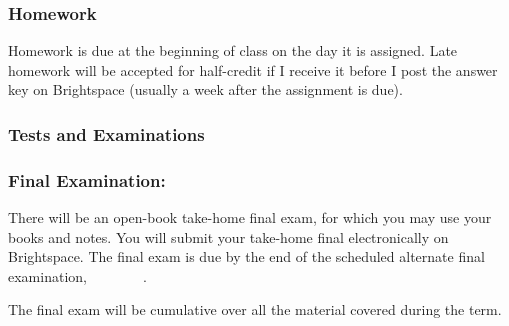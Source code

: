 \documentclass[11pt,twoside]{jgsyllabus}\usepackage[]{graphicx}\usepackage[]{color}
\begin{document}
\subsubsection{Homework}
Homework is due at the beginning of class on the day it is assigned.
Late homework will be accepted for half-credit if I receive it before I post
the answer key on Brightspace (usually a week after the assignment is due).
\fi
\iffalse
  \subsubsection{Projects}
  You will do a few extended projects, which constitute policy analyses of
  possible measures to reduce greenhouse gas emissions.
\fi

\subsubsection{Tests and Examinations}
\iffalse
There will be one in-class midterm exam, on
\textbf{Monday, February~28}.
This test will be closed book.
I will hold a review session before the test.
\textbf{You will need to bring a calculator, number two pencils, and erasers
to the in-class test.}
\fi
\subsubsection{Final Examination:}
There will be an open-book take-home final exam, for which you may use your
books and notes.
You will submit your take-home final electronically on Brightspace.
The final exam is due by the end of the scheduled
\ifAltFinal alternate \fi final examination,
\ifAltFinal
  \AltFinalExamEndTime\ \AltFinalExamDay\ \AltFinalExamMonth~\AltFinalExamDate
\else
  \FinalExamEndTime\ \FinalExamDay\ \FinalExamMonth~\FinalExamDate
\fi.
%

The final exam will be cumulative over all the material covered during the term.

\end{document}
